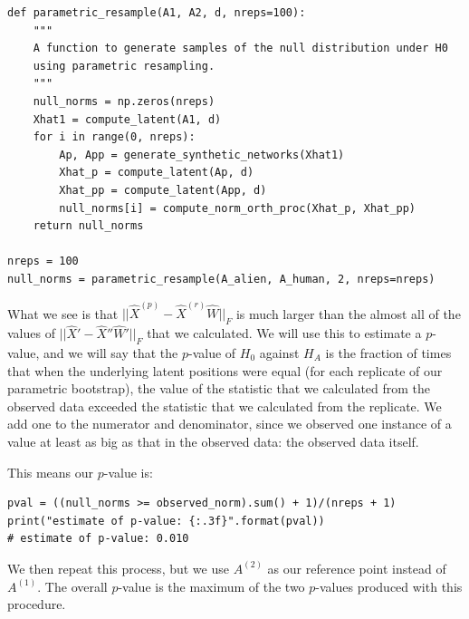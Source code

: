 \begin{lstlisting}[style=python]
def parametric_resample(A1, A2, d, nreps=100):
    """
    A function to generate samples of the null distribution under H0
    using parametric resampling.
    """
    null_norms = np.zeros(nreps)
    Xhat1 = compute_latent(A1, d)
    for i in range(0, nreps):
        Ap, App = generate_synthetic_networks(Xhat1)
        Xhat_p = compute_latent(Ap, d)
        Xhat_pp = compute_latent(App, d)
        null_norms[i] = compute_norm_orth_proc(Xhat_p, Xhat_pp)
    return null_norms

nreps = 100
null_norms = parametric_resample(A_alien, A_human, 2, nreps=nreps)
\end{lstlisting}

What we see is that $||\hat X^{(p)} - \hat X^{(r)}\hat W||_{F}$ is much larger than the almost all of the values of $|| \hat X' - \hat X''\hat W'||_{F}$ that we calculated. We will use this to estimate a $p$-value, and we will say that the $p$-value of $H_0$ against $H_A$ is the fraction of times that when the underlying latent positions were equal (for each replicate of our parametric bootstrap), the value of the statistic that we calculated from the observed data exceeded the statistic that we calculated from the replicate. We add one to the numerator and denominator, since we observed one instance of a value at least as big as that in the observed data: the observed data itself. 

This means our $p$-value is:

\begin{lstlisting}[style=python]
pval = ((null_norms >= observed_norm).sum() + 1)/(nreps + 1)
print("estimate of p-value: {:.3f}".format(pval))
# estimate of p-value: 0.010
\end{lstlisting}

We then repeat this process, but we use $A^{(2)}$ as our reference point instead of $A^{(1)}$. The overall $p$-value is the maximum of the two $p$-values produced with this procedure.

